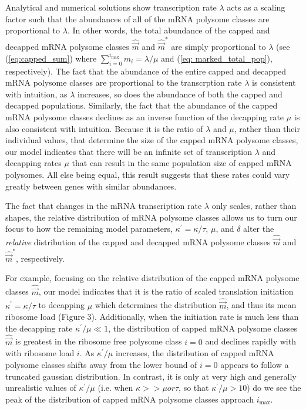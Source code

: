 \documentclass[a4,center,fleqn,nocrop]{NAR}
\newcommand{\imax}{\ensuremath{{i_{\max}}}\xspace}
\newcommand{\kappaprime}{\ensuremath{\kappa^{\prime}}\xspace}
\newcommand{\mvec}{\ensuremath{\vec{m}}\xspace}
\newcommand{\mvechat}{\ensuremath{\hat{\mvec}}\xspace}
\newcommand{\mvechatstar}{\ensuremath{\mvechat^*}\xspace}
\begin{document}
Analytical and numerical solutions show transcription rate $\lambda$ acts as a scaling factor such that the abundances
  of all of the mRNA polysome classes are proportional to $\lambda$.
  In other words, the total abundance of the capped and decapped mRNA polysome classes $\mvechat$ and $\mvechatstar$ are simply proportional to $\lambda$ (see (\ref{eq:capped_sum}) where $\sum_{i = 0} ^\imax m_i = \lambda/\mu$ and (\ref{eq: marked_total_pop}), respectively).
  The fact that the abundance of the entire capped and decapped mRNA polysome classes are proportional to the transcrption rate $\lambda$ is consistent with intuition, as $\lambda$ increases, so does the abundance of both the capped and decapped populations.
  Similarly, the fact that the abundance of the capped mRNA polysome classes declines as an inverse function of the decapping rate $\mu$ is also consistent with intuition.
  Because it is the ratio of $\lambda$ and $\mu$, rather than their individual values, that determine the size of the capped mRNA polysome classes, our model indicates that there will be an infinite set of transcription $\lambda$ and decapping rates $\mu$ that can result in the same population size of capped mRNA polysomes.
  All else being equal, this result suggests that these rates could vary greatly between genes with similar abundances.


The fact that changes in the mRNA transcription rate  $\lambda$ only scales, rather than shapes, the relative distribution of mRNA polysome classes allows us to turn our focus to how the remaining model parameters, $\kappaprime = \kappa/\tau$, $\mu$, and $\delta$ alter the \emph{relative} distribution of the capped and decapped mRNA polysome classes \mvechat and \mvechatstar, respectively.

For example, focusing on the relative distribution of the capped mRNA polysome classes $\mvechat$, our model indicates that it is the ratio of scaled translation initiation $\kappaprime = \kappa/\tau$ to decapping $\mu$ which determines the distribution \mvechat, and thus its mean ribosome load  (Figure 3).
    Additionally, when the initiation rate is much less than the decapping rate $\kappaprime/\mu \ll 1$, the distribution of capped mRNA polysome classes $\mvechat$ is greatest in the ribosome free polysome class $i=0$ and declines rapidly with with ribosome load $i$.
    As $\kappaprime/\mu$ increases, the distribution of capped mRNA polysome classes shifts away from the lower bound of $i = 0$ appears to follow a truncated gaussian distribution.
    In contrast, it is only at very high and generally unrealistic values of $\kappaprime/\mu$ (i.e.  when $\kappa>>\mu or \tau$, so that $\kappaprime/\mu > 10$) do we see the peak of the distribution of capped mRNA polysome classes approach $\imax$.
\end{document}
